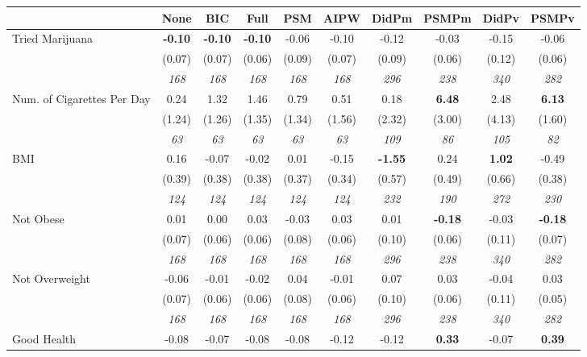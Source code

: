\begin{tabular}{l c c c c c c c c c}
\toprule
 & None & BIC & Full & PSM & AIPW & DidPm & PSMPm & DidPv & PSMPv \\
\midrule
Tried Marijuana & \textbf{ -0.10 } & \textbf{ -0.10 } & \textbf{ -0.10 } & -0.06 & -0.10 & -0.12 & -0.03 & -0.15 & -0.06 \\
& (0.07) & (0.07) & (0.06) & (0.09) & (0.07) & (0.09) & (0.06) & (0.12) & (0.06) \\
& \textit{ 168 } & \textit{ 168 } & \textit{ 168 } & \textit{ 168 } & \textit{ 168 } & \textit{ 296 } & \textit{ 238 } & \textit{ 340 } & \textit{ 282 } \\
Num. of Cigarettes Per Day & 0.24 & 1.32 & 1.46 & 0.79 & 0.51 & 0.18 & \textbf{6.48} & 2.48 & \textbf{6.13} \\
& (1.24) & (1.26) & (1.35) & (1.34) & (1.56) & (2.32) & (3.00) & (4.13) & (1.60) \\
& \textit{ 63 } & \textit{ 63 } & \textit{ 63 } & \textit{ 63 } & \textit{ 63 } & \textit{ 109 } & \textit{ 86 } & \textit{ 105 } & \textit{ 82 } \\
BMI & 0.16 & -0.07 & -0.02 & 0.01 & -0.15 & \textbf{ -1.55 } & 0.24 & \textbf{ 1.02 } & -0.49 \\
& (0.39) & (0.38) & (0.38) & (0.37) & (0.34) & (0.57) & (0.49) & (0.66) & (0.38) \\
& \textit{ 124 } & \textit{ 124 } & \textit{ 124 } & \textit{ 124 } & \textit{ 124 } & \textit{ 232 } & \textit{ 190 } & \textit{ 272 } & \textit{ 230 } \\
Not Obese & 0.01 & 0.00 & 0.03 & -0.03 & 0.03 & 0.01 & \textbf{-0.18} & -0.03 & \textbf{-0.18} \\
& (0.07) & (0.06) & (0.06) & (0.08) & (0.06) & (0.10) & (0.06) & (0.11) & (0.07) \\
& \textit{ 168 } & \textit{ 168 } & \textit{ 168 } & \textit{ 168 } & \textit{ 168 } & \textit{ 296 } & \textit{ 238 } & \textit{ 340 } & \textit{ 282 } \\
Not Overweight & -0.06 & -0.01 & -0.02 & 0.04 & -0.01 & 0.07 & 0.03 & -0.04 & 0.03 \\
& (0.07) & (0.06) & (0.06) & (0.08) & (0.06) & (0.10) & (0.06) & (0.11) & (0.05) \\
& \textit{ 168 } & \textit{ 168 } & \textit{ 168 } & \textit{ 168 } & \textit{ 168 } & \textit{ 296 } & \textit{ 238 } & \textit{ 340 } & \textit{ 282 } \\
Good Health & -0.08 & -0.07 & -0.08 & -0.08 & -0.12 & -0.12 & \textbf{0.33} & -0.07 & \textbf{0.39} \\

\end{tabular}
